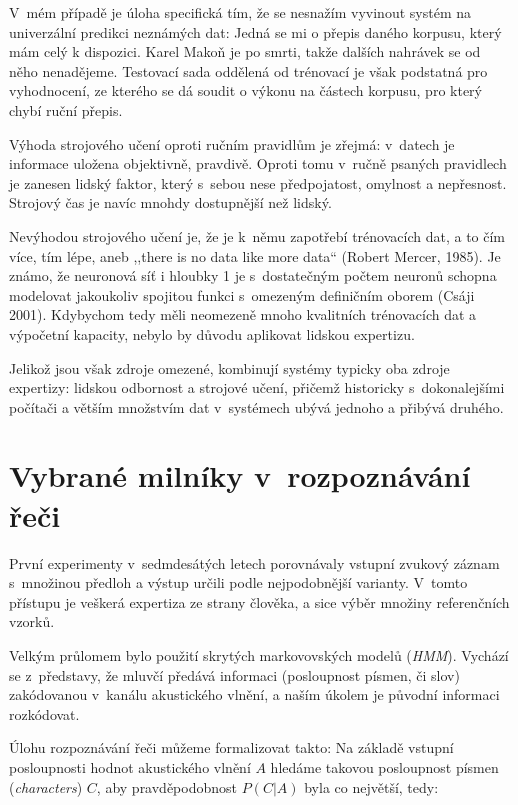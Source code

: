 V~mém případě je úloha specifická tím, že se nesnažím vyvinout systém na
univerzální predikci neznámých dat: Jedná se mi o přepis daného korpusu, který
mám celý k dispozici. Karel Makoň je po smrti, takže dalších nahrávek se od něho
nenadějeme. Testovací sada oddělená od trénovací je však podstatná pro
vyhodnocení, ze kterého se dá soudit o výkonu na částech korpusu, pro který
chybí ruční přepis.

Výhoda strojového učení oproti ručním pravidlům je zřejmá: v~datech je informace
uložena objektivně, pravdivě. Oproti tomu v~ručně psaných pravidlech je zanesen
lidský faktor, který s~sebou nese předpojatost, omylnost a nepřesnost. Strojový
čas je navíc mnohdy dostupnější než lidský.

Nevýhodou strojového učení je, že je k~němu zapotřebí trénovacích dat, a to čím
více, tím lépe, aneb ,,there is no data like more data`` (Robert Mercer, 1985). Je
známo, že neuronová síť i hloubky 1 je s~dostatečným počtem neuronů schopna
modelovat jakoukoliv spojitou funkci s~omezeným definičním oborem (Csáji
2001)\cite{csaji2001approximation}. Kdybychom tedy měli neomezeně mnoho
kvalitních trénovacích dat a výpočetní kapacity, nebylo by důvodu aplikovat
lidskou expertizu.

Jelikož jsou však zdroje omezené, kombinují systémy typicky oba zdroje
expertizy: lidskou odbornost a strojové učení, přičemž historicky
s~dokonalejšími počítači a větším množstvím dat v~systémech ubývá jednoho a
přibývá druhého.

\section{Vybrané milníky v~rozpoznávání řeči}

První experimenty v~sedmdesátých letech porovnávaly vstupní zvukový záznam
s~množinou předloh a výstup určili podle nejpodobnější
varianty\cite{huang2014historical}. V~tomto přístupu je veškerá expertiza ze
strany člověka, a sice výběr množiny referenčních vzorků.

Velkým průlomem bylo použití skrytých
markovovských modelů (\textit{HMM}). Vychází se z~představy, že mluvčí předává
informaci (posloupnost písmen, či slov) zakódovanou v~kanálu akustického vlnění,
a naším úkolem je původní informaci rozkódovat.

Úlohu rozpoznávání řeči můžeme formalizovat takto: Na základě vstupní
posloupnosti hodnot akustického vlnění $A$ hledáme takovou posloupnost písmen
(\textit{characters}) $C$, aby pravděpodobnost $P(C|A)$ byla co největší, tedy:

